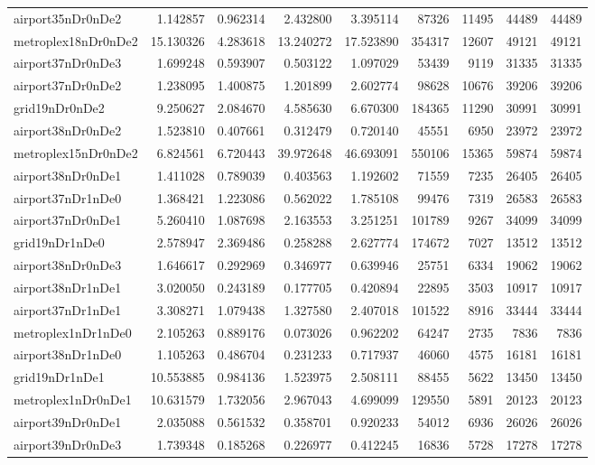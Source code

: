 \begin{longtable}{|l|r|r|r|r|r|r|r|r|}
airport35nDr0nDe2 & 1.142857 & 0.962314 & 2.432800 & 3.395114 & 87326 & 11495 & 44489 & 44489 \\
metroplex18nDr0nDe2 & 15.130326 & 4.283618 & 13.240272 & 17.523890 & 354317 & 12607 & 49121 & 49121 \\
airport37nDr0nDe3 & 1.699248 & 0.593907 & 0.503122 & 1.097029 & 53439 & 9119 & 31335 & 31335 \\
airport37nDr0nDe2 & 1.238095 & 1.400875 & 1.201899 & 2.602774 & 98628 & 10676 & 39206 & 39206 \\
grid19nDr0nDe2 & 9.250627 & 2.084670 & 4.585630 & 6.670300 & 184365 & 11290 & 30991 & 30991 \\
airport38nDr0nDe2 & 1.523810 & 0.407661 & 0.312479 & 0.720140 & 45551 & 6950 & 23972 & 23972 \\
metroplex15nDr0nDe2 & 6.824561 & 6.720443 & 39.972648 & 46.693091 & 550106 & 15365 & 59874 & 59874 \\
airport38nDr0nDe1 & 1.411028 & 0.789039 & 0.403563 & 1.192602 & 71559 & 7235 & 26405 & 26405 \\
airport37nDr1nDe0 & 1.368421 & 1.223086 & 0.562022 & 1.785108 & 99476 & 7319 & 26583 & 26583 \\
airport37nDr0nDe1 & 5.260410 & 1.087698 & 2.163553 & 3.251251 & 101789 & 9267 & 34099 & 34099 \\
grid19nDr1nDe0 & 2.578947 & 2.369486 & 0.258288 & 2.627774 & 174672 & 7027 & 13512 & 13512 \\
airport38nDr0nDe3 & 1.646617 & 0.292969 & 0.346977 & 0.639946 & 25751 & 6334 & 19062 & 19062 \\
airport38nDr1nDe1 & 3.020050 & 0.243189 & 0.177705 & 0.420894 & 22895 & 3503 & 10917 & 10917 \\
airport37nDr1nDe1 & 3.308271 & 1.079438 & 1.327580 & 2.407018 & 101522 & 8916 & 33444 & 33444 \\
metroplex1nDr1nDe0 & 2.105263 & 0.889176 & 0.073026 & 0.962202 & 64247 & 2735 & 7836 & 7836 \\
airport38nDr1nDe0 & 1.105263 & 0.486704 & 0.231233 & 0.717937 & 46060 & 4575 & 16181 & 16181 \\
grid19nDr1nDe1 & 10.553885 & 0.984136 & 1.523975 & 2.508111 & 88455 & 5622 & 13450 & 13450 \\
metroplex1nDr0nDe1 & 10.631579 & 1.732056 & 2.967043 & 4.699099 & 129550 & 5891 & 20123 & 20123 \\
airport39nDr0nDe1 & 2.035088 & 0.561532 & 0.358701 & 0.920233 & 54012 & 6936 & 26026 & 26026 \\
airport39nDr0nDe3 & 1.739348 & 0.185268 & 0.226977 & 0.412245 & 16836 & 5728 & 17278 & 17278 \\

\end{longtable}

